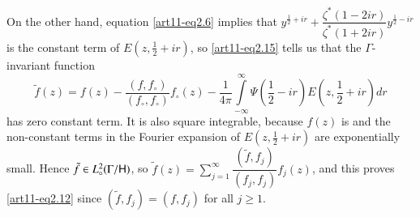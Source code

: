 On the other hand, equation \eqref{art11-eq2.6} implies that $y^{\frac{1}{2} + ir} + \dfrac{\zeta^\ast (1-2 i r)}{\zeta^\ast(1+ 2 ir)} y^{\frac{1}{2} - ir}$ is the constant term of $E(z, \frac{1}{2} + ir )$, so \eqref{art11-eq2.15}  tells us that the $\Gamma$-invariant function 
$$
\tilde{f}(z) = f(z) - \frac{(f, f_\circ)}{(f_\circ, f_\circ)} f_\circ (z)  -\frac{1}{4\pi} \int\limits^\infty_{-\infty} \Psi (\frac{1}{2} -ir ) E (z, \frac{1}{2} + ir) dr
$$
has zero constant term. It is also square integrable, because $f(z)$ is and the non-constant terms in the Fourier expansion of $E(z, \frac{1}{2} + ir)$ are exponentially small. Hence $\tilde{f} \in L^2_\circ (\Gamma / \mathsf{H})$, so $\tilde{f}(z) = \sum\limits^\infty_{j=1} \dfrac{(\tilde{f}, f_j)}{(f_j , f_j)} f_j (z)$, and this proves \eqref{art11-eq2.12} since $(\tilde{f}, f_j) = (f, f_j)$ for all $j \geq 1$. 

